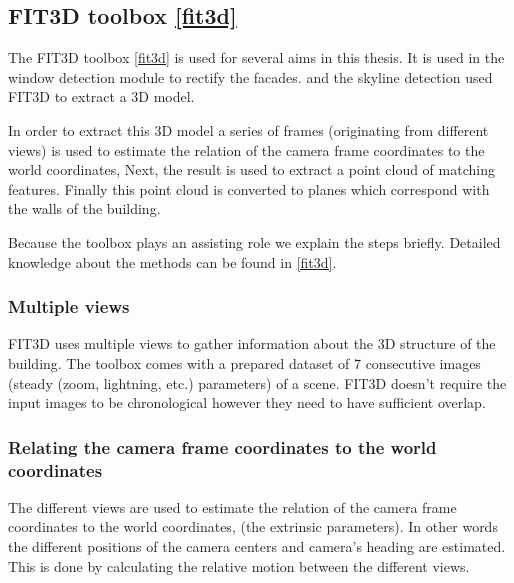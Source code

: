 %  
%  


\subsection{FIT3D toolbox \ref{fit3d}}
\label{sec:prelimFIT3D}
The FIT3D toolbox \ref{fit3d} is used for several aims in this thesis.
It is used in the window detection module to rectify the facades.
and the skyline detection used FIT3D to extract a 3D model.

In order to extract this 3D model a series of frames (originating from different
views) is used to estimate the relation of the camera frame coordinates to the
world coordinates, Next, the result is used to extract a point cloud of matching
features. Finally this point cloud is converted to planes which correspond with the walls of the building.

Because the toolbox plays an assisting role we explain the steps briefly.
Detailed knowledge about the methods can be found in \ref{fit3d}.

\subsubsection{Multiple views}
FIT3D uses multiple views to gather information about the 3D structure of the
building. The toolbox comes with a prepared dataset of 7 consecutive images (steady (zoom, lightning,
etc.) parameters) of a scene.  FIT3D doesn't require the input images to be
chronological however they need to have sufficient overlap. 


\subsubsection{Relating the camera frame coordinates to the world coordinates}
The different views are used to estimate the relation of the camera frame
coordinates to the world coordinates, (the extrinsic parameters).  In other
words the different positions of the camera centers and camera's heading are
estimated.  This is done by calculating the relative motion between the
different views.\\

